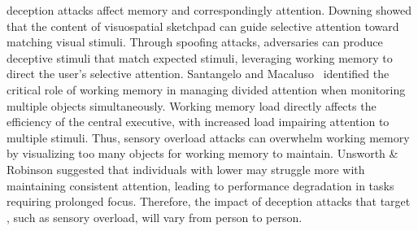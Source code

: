

\MR deception attacks affect memory and correspondingly attention.
Downing \cite{downing2000interactions} showed that the content of visuospatial sketchpad can guide selective attention toward matching visual stimuli. 
Through spoofing attacks, adversaries can produce deceptive stimuli that match expected stimuli, leveraging working memory to direct the user's selective attention.
Santangelo and Macaluso~\cite{santangelo2013contribution} identified the critical role of working memory in managing divided attention
when monitoring multiple objects simultaneously. 
Working memory load directly affects the efficiency of the central executive, with increased load impairing attention to multiple stimuli. 
Thus, sensory overload attacks can overwhelm working memory by visualizing too many objects for working memory to maintain.
Unsworth \& Robinson \cite{unsworth2020working} suggested 
that individuals with lower \WMC may struggle more with maintaining consistent attention, leading to performance degradation in tasks requiring prolonged focus. 
Therefore, the impact of \MR deception attacks that target \WMC, such as sensory overload, will vary from person to person.


